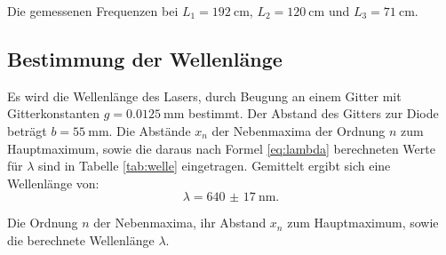 \begin{table}
	\centering
	\caption{Die gemessenen Frequenzen bei $L_1=\SI{192}{\centi\metre}$, $L_2=\SI{120}{\centi\metre}$ und $L_3=\SI{71}{\centi\metre}$.}
	
	\label{tab:longitudinal}
\end{table}

\subsection{Bestimmung der Wellenlänge}

Es wird die Wellenlänge des Lasers, durch Beugung an einem Gitter mit Gitterkonstanten $g=\SI{0.0125}{\milli\metre}$ bestimmt. Der Abstand des Gitters zur Diode beträgt $b=\SI{55}{\milli\metre}$. Die Abstände $x_n$ der Nebenmaxima der Ordnung $n$ zum Hauptmaximum, sowie die daraus nach Formel \eqref{eq:lambda} berechneten Werte für $\lambda$ sind in Tabelle \ref{tab:welle} eingetragen.
Gemittelt ergibt sich eine Wellenlänge von:
\[
\lambda = \SI{640(17)}{\nano\metre} \text{.}
\] 

\begin{table}
	\centering
	\caption{Die Ordnung $n$ der Nebenmaxima, ihr Abstand $x_n$ zum Hauptmaximum, sowie die berechnete Wellenlänge $\lambda$.}
	
	\label{tab:welle}
\end{table}